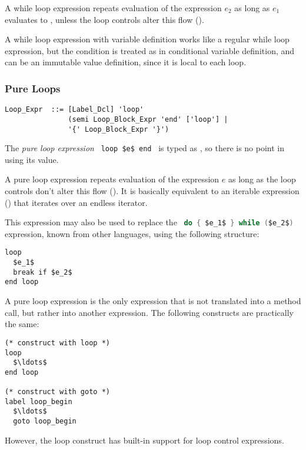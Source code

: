 A while loop expression repeats evaluation of the expression $e_2$ as long as $e_1$ evaluates to , unless the loop controls alter this flow ().

A while loop expression with variable definition works like a regular while loop expression, but the condition is treated as in conditional variable definition, and can be an immutable value definition, since it is local to each loop. 





\subsubsection{Pure Loops}
\label{sec:pure-loops}

\syntax\begin{lstlisting}
Loop_Expr  ::= [Label_Dcl] 'loop'
               (semi Loop_Block_Expr 'end' ['loop'] | 
               '{' Loop_Block_Expr '}')
\end{lstlisting}

The {\em pure loop expression} ~\lstinline!loop $e$ end!~ is typed as , so there is no point in using its value. 

A pure loop expression repeats evaluation of the expression $e$ as long as the loop controls don't alter this flow (). It is basically equivalent to an iterable expression () that iterates over an endless iterator. 

This expression may also be used to replace the ~\lstinline[language=Java]!do { $e_1$ } while ($e_2$)!~ expression, known from other languages, using the following structure: 
\begin{lstlisting}
loop
  $e_1$
  break if $e_2$
end loop
\end{lstlisting}

A pure loop expression is the only expression that is not translated into a method call, but rather into another expression. The following constructs are practically the same: 
\begin{lstlisting}
(* construct with loop *)
loop
  $\ldots$
end loop

(* construct with goto *)
label loop_begin
  $\ldots$
  goto loop_begin
\end{lstlisting}
However, the loop construct has built-in support for loop control expressions. 





